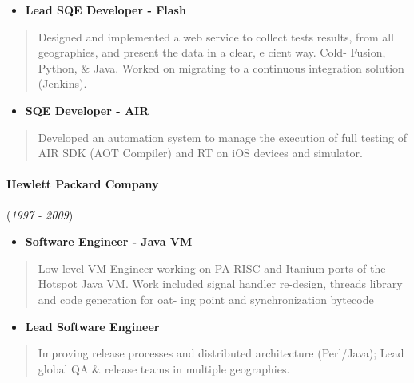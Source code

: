 \documentclass[8pt, a4paper]{article}
\providecommand{\tightlist}{%
  \setlength{\itemsep}{0pt}\setlength{\parskip}{0pt}}
\begin{document}
\begin{multicols}{2}
\begin{small}
\begin{raggedright}
\begin{itemize}
\tightlist
\item
  \textbf{Lead SQE Developer - Flash}
\end{itemize}

\begin{quote}
Designed and implemented a web service to collect tests results, from
all geographies, and present the data in a clear, e cient way. Cold-
Fusion, Python, \& Java. Worked on migrating to a continuous integration
solution (Jenkins).
\end{quote}

\begin{itemize}
\tightlist
\item
  \textbf{SQE Developer - AIR}
\end{itemize}

\begin{quote}
Developed an automation system to manage the execution of full testing
of AIR SDK (AOT Compiler) and RT on iOS devices and simulator.
\end{quote}

\hypertarget{hewlett-packard-company}{%
\paragraph{Hewlett Packard Company}\label{hewlett-packard-company}}

(\emph{1997 - 2009})

\begin{itemize}
\tightlist
\item
  \textbf{Software Engineer - Java VM}
\end{itemize}

\begin{quote}
Low-level VM Engineer working on PA-RISC and Itanium ports of the
Hotspot Java VM. Work included signal handler re-design, threads library
and code generation for oat- ing point and synchronization bytecode
\end{quote}

\begin{itemize}
\tightlist
\item
  \textbf{Lead Software Engineer}
\end{itemize}

\begin{quote}
Improving release processes and distributed architecture (Perl/Java);
Lead global QA \& release teams in multiple geographies.
\end{quote}


\end{raggedright}
\end{small}
\end{multicols}
\end{document}
